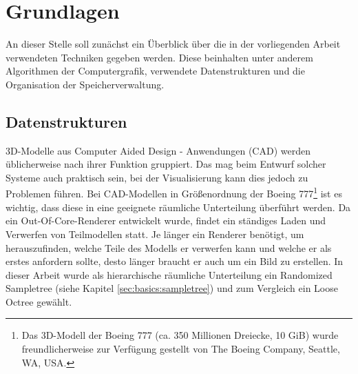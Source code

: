 \chapter{Grundlagen}
\label{chap:basics}
%
%
%
An dieser Stelle soll zunächst ein Überblick über die in der vorliegenden Arbeit verwendeten Techniken gegeben werden. Diese beinhalten unter anderem Algorithmen der Computergrafik, verwendete Datenstrukturen und die Organisation der Speicherverwaltung.

\section{Datenstrukturen}
\label{sec:basics:datenstrukturen}
3D-Modelle aus Computer Aided Design - Anwendungen (CAD) werden üblicherweise nach ihrer Funktion gruppiert. Das mag beim Entwurf solcher Systeme auch praktisch sein, bei der Visualisierung kann dies jedoch zu Problemen führen. Bei CAD-Modellen in Größenordnung der Boeing 777\footnote{%
Das 3D-Modell der Boeing 777 (ca. 350 Millionen Dreiecke, 10 GiB) wurde freundlicherweise zur Verfügung gestellt von The Boeing Company, Seattle, WA, USA.} ist es wichtig, dass diese in eine geeignete räumliche Unterteilung überführt werden. Da ein Out-Of-Core-Renderer entwickelt wurde, findet ein ständiges Laden und Verwerfen von Teilmodellen statt. Je länger ein Renderer benötigt, um herauszufinden, welche Teile des Modells er verwerfen kann und welche er als erstes anfordern sollte, desto länger braucht er auch um ein Bild zu erstellen. In dieser Arbeit wurde als hierarchische räumliche Unterteilung ein Randomized Sampletree (siehe Kapitel \ref{sec:basics:sampletree}) und zum Vergleich ein Loose Octree gewählt.

